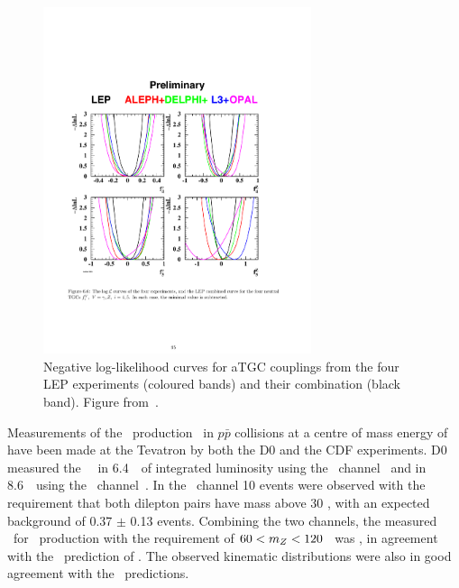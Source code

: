 \begin{figure}
\centering
        \includegraphics[width=0.7\textwidth]{lep_tgc}
    \caption[Negative log-likelihood curves for aTGC couplings from the four LEP
    experiments (coloured bands) and their combination (black band).]
    {Negative log-likelihood curves for aTGC couplings from the four LEP
    experiments (coloured bands) and their combination (black band). Figure from~\cite{bib:LEPEW2006}.}
    \label{fig:lep-tgc}
\end{figure}

Measurements of the \ZZ\ production \cx\ in $p \bar{p}$
collisions at a centre of mass energy of  have been made
at the Tevatron by both the D0 and the CDF experiments. D0 measured the \ZZ\ \cx\ in
6.4~\ifb\ of integrated luminosity using the \ZZllll\
channel~\cite{Abazov:2011td} and in 8.6~\ifb\ using the
\ZZllvv\ channel~\cite{Abazov:2012cj}. In the \ZZllll\ channel 10 events
were observed with the requirement that both dilepton pairs have mass above 30
\gev, with an expected background of 0.37 $\pm$ 0.13 events. Combining the two
channels, the measured \cx\ for \ZZ\ production with the requirement of $60 < m_{Z}
< 120$ \gev\ was 
, 
in agreement with the \sm\ prediction of \crossSec{p\bar p\ra ZZ}{1.3 \pm 0.1 \, \rm{pb}}. 
The observed kinematic distributions were
also in good agreement with the \sm\ predictions. 

